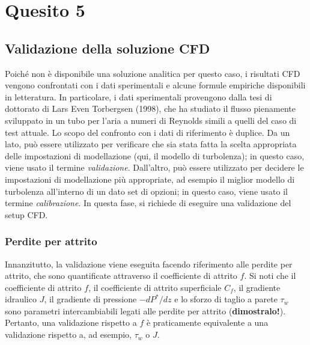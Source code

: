 
\section{Quesito 5}

\subsection*{Validazione della soluzione CFD}

\vspace{0.5em}

Poiché non è disponibile una soluzione analitica per questo caso, i risultati CFD vengono confrontati con i dati sperimentali e alcune formule empiriche disponibili in letteratura. In particolare, i dati sperimentali provengono dalla tesi di dottorato di Lars Even Torbergsen (1998), che ha studiato il flusso pienamente sviluppato in un tubo per l'aria a numeri di Reynolds simili a quelli del caso di test attuale. Lo scopo del confronto con i dati di riferimento è duplice. Da un lato, può essere utilizzato per verificare che sia stata fatta la scelta appropriata delle impostazioni di modellazione (qui, il modello di turbolenza); in questo caso, viene usato il termine \emph{validazione}. Dall'altro, può essere utilizzato per decidere le impostazioni di modellazione più appropriate, ad esempio il miglior modello di turbolenza all'interno di un dato set di opzioni; in questo caso, viene usato il termine \emph{calibrazione}. In questa fase, si richiede di eseguire una validazione del setup CFD.

\subsubsection*{Perdite per attrito}

Innanzitutto, la validazione viene eseguita facendo riferimento alle perdite per attrito, che sono quantificate attraverso il coefficiente di attrito \(f\). Si noti che il coefficiente di attrito \(f\), il coefficiente di attrito superficiale \(C_f\), il gradiente idraulico \(J\), il gradiente di pressione \(-dP^*/dz\) e lo sforzo di taglio a parete \(\tau_w\) sono parametri intercambiabili legati alle perdite per attrito (\textbf{dimostralo!}). Pertanto, una validazione rispetto a \(f\) è praticamente equivalente a una validazione rispetto a, ad esempio, \(\tau_w\) o \(J\).

